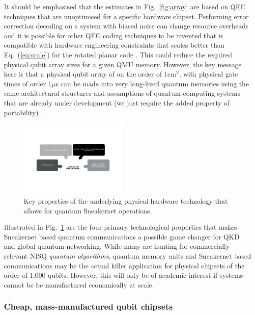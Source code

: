 \documentclass[twocolumn, aps, rmp, amsmath, amssymb, nofootinbib, superscriptaddress, longbibliography, floatfix, table-of-contents, eqsecnum]{revtex4-2}
\begin{document}
It should be emphasised that the estimates in Fig.~\ref{fig:array} are based on QEC techniques that are unoptimised for a specific hardware chipset. Performing error correction decoding on a system with biased noise \cite{SD-Tuckett:2018aa} can change resource overheads and it is possible for other QEC coding techniques to be invented that is compatible with hardware engineering constraints that scales better than Eq.~(\ref{eq:scale}) for the rotated planar code \cite{SD-Bombin:2015aa,SD-Breuckmann:2017aa,SD-Fawzi:2018aa}. This could reduce the required physical qubit array sizes for a given QMU memory. However, the key message here is that a physical qubit array of on the order of 1cm$^2$, with physical gate times of order 1$\mu$s can be made into very long-lived quantum memories using the same architectural structures and assumptions of quantum computing systems that are already under development (we just require the added property of portability) \cite{SD-Jones:2012aa, SD-Gimeno-Segovia:2015aa, SD-Nemoto:2014aa, SD-Hill:2015aa, SD-Lekitsch:2017aa}. 

\begin{figure}[htbp!]
	\includegraphics[clip=true, width=0.475\textwidth]{goal}
	\caption{Key properties of the underlying physical hardware technology that allows for quantum Sneakernet operations.} \label{fig:goal}
\end{figure}

Illustrated in Fig.~\ref{fig:goal} are the four primary technological properties that makes Sneakernet based quantum communications a possible game changer for QKD and global quantum networking. While many are hunting for commercially relevant NISQ \textit{quantum algorithms}, quantum memory units and Sneakernet based communications may be the actual killer application for physical chipsets of the order of 1,000 qubits. However, this will only be of academic interest if systems cannot be be manufactured economically at scale.

\subsubsection{Cheap, mass-manufactured qubit chipsets}
\end{document}
